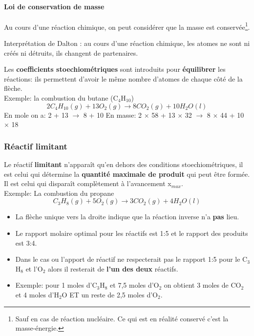 \documentclass[10pt,a4paper]{book}
\newcommand{\x}{$\times$ }
\begin{document}
\paragraph{Loi de conservation de masse} Au cours d’une réaction chimique, on peut considérer que la masse est conservée\footnote{Sauf en cas de réaction nucléaire. Ce qui est en réalité conservé c’est la masse-énergie.}. \par
Interprétation de Dalton : au cours d’une réaction chimique, les atomes ne sont ni créés ni détruits, ils changent de partenaires. \par
Les \textbf{coefficients stoechiométriques} sont introduits pour \textbf{équilibrer} les réactions: ils permettent d'avoir le même nombre d'atomes de chaque côté de la flèche.\\
Exemple: la combustion du butane (C$_4$H$_10$)
\begin{displaymath}
2C_4H_10(g) + 13O_2(g) \longrightarrow 8CO_2(g) + 10H_2O(l)
\end{displaymath}
En mole on a: 2 + 13 $\longrightarrow$ 8 + 10
En masse: 2 $\times$ 58 + 13 \x 32 $\longrightarrow$ 8 \x 44 + 10 \x 18

\subsubsection{Réactif limitant}

Le réactif \textbf{limitant} n'apparaît qu'en dehors des conditions stoechiométriques, il est celui qui détermine la \textbf{quantité maximale de produit} qui peut être formée. \\
Il est celui qui disparaît complètement à l'avancement x$_{max}$. \\
Exemple: La combustion du propane
\begin{displaymath}
C_3H_8(g) + 5O_2(g) \longrightarrow 3CO_2(g) + 4H_2O(l)
\end{displaymath}
\begin{itemize}
\item La flèche unique vers la droite indique que la réaction inverse n'a \textbf{pas} lieu.
\item Le rapport molaire optimal pour les réactifs est 1:5 et le rapport des produits est 3:4.
\item Dans le cas ou l'apport de réactif ne respecterait pas le rapport 1:5 pour le C$_3$H$_8$ et l'O$_2$ alors il resterait de \textbf{l'un des deux} réactifs.
\item Exemple: pour 1 moles d'C$_3$H$_8$ et 7,5 moles d'O$_2$ on obtient 3 moles de CO$_2$ et 4 moles d'H$_2$O ET un reste de 2,5 moles d'O$_2$.
\end{itemize}
\end{document}
